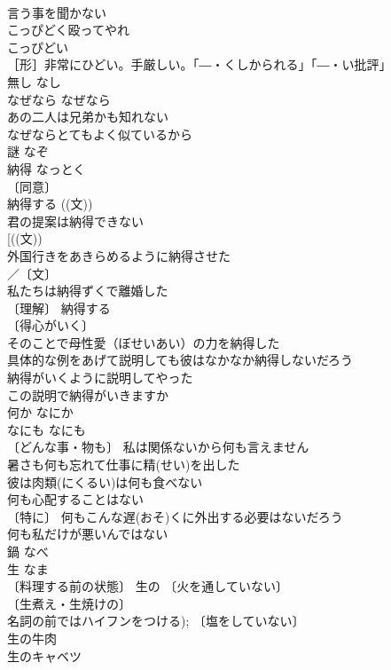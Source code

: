 \documentclass[8pt]{extreport}
\begin{document}
\begin{CJK}{UTF8}{min}
\\	言う事を聞かない 
\\	こっぴどく殴ってやれ 
\\	こっぴどい　
\\	［形］非常にひどい。手厳しい。「―・くしかられる」「―・い批評」
\\	無し	なし	
\\	なぜなら	なぜなら	
\\	あの二人は兄弟かも知れない
\\	なぜならとてもよく似ているから 
\\	謎	なぞ	
\\	納得	なっとく	
\\	〔同意〕
\\	納得する ((文)) 
\\	君の提案は納得できない 
\\	[((文))
\\	外国行きをあきらめるように納得させた 
\\	／〔文〕
\\	私たちは納得ずくで離婚した 
\\	〔理解〕 納得する 
\\	〔得心がいく〕
\\	そのことで母性愛（ぼせいあい）の力を納得した 
\\	具体的な例をあげて説明しても彼はなかなか納得しないだろう 
\\	納得がいくように説明してやった 
\\	この説明で納得がいきますか 
\\	何か	なにか	
\\	なにも	なにも	
\\	〔どんな事・物も〕 私は関係ないから何も言えません 
\\	暑さも何も忘れて仕事に精(せい)を出した 
\\	彼は肉類(にくるい)は何も食べない 
\\	何も心配することはない 
\\	〔特に〕 何もこんな遅(おそ)くに外出する必要はないだろう 
\\	何も私だけが悪いんではない 
\\	鍋	なべ	
\\	生	なま	
\\	〔料理する前の状態〕 生の 〔火を通していない〕
\\	〔生煮え・生焼けの〕
\\	名詞の前ではハイフンをつける); 〔塩をしていない〕
\\	生の牛肉 
\\	生のキャベツ 

\end{CJK}
\end{document}
